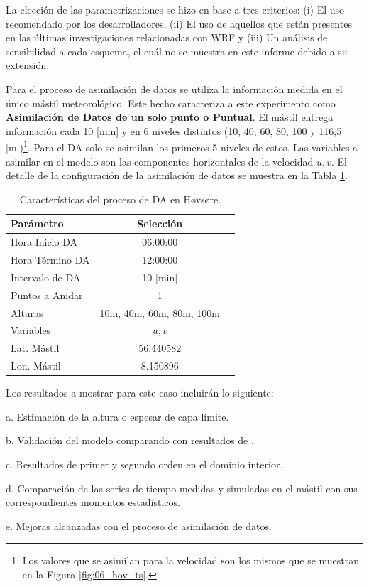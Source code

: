 
La elección de las parametrizaciones se hizo en base a tres criterios: (i) El uso recomendado por los desarrolladores, (ii) El uso de aquellos que están presentes en las últimas investigaciones relacionadas con WRF y (iii) Un análisis de sensibilidad a cada esquema, el cuál no se muestra en este informe debido a su extensión.

Para el proceso de asimilación de datos se utiliza la información medida en el único mástil meteorológico. Este hecho caracteriza a este experimento como \textbf{Asimilación de Datos de un solo punto o Puntual}. El mástil entrega información cada 10 [min] y en 6 niveles distintos (10, 40, 60, 80, 100 y 116,5 [m])\footnote{Los valores que se asimilan para la velocidad son los mismos que se muestran en la Figura \ref{fig:06_hov_ts}.}. Para el DA solo se asimilan los primeros 5 niveles de estos. Las variables a asimilar en el modelo son las componentes horizontales de la velocidad $u,v$. El detalle de la configuración de la asimilación de datos se muestra en la Tabla \ref{tab:05_config_da_hov}.

\begin{table}[h!]
	\caption{Características del proceso de DA en Høvsøre.}\label{tab:05_config_da_hov}
	\centering\footnotesize
	\begin{tabular}{lcc}
		\toprule
		Parámetro & Selección \\
		\midrule
		Hora Inicio	DA 	 & 06:00:00   \\
		Hora Término DA	 		 & 12:00:00  \\
		Intervalo de DA	&	10 [min] \\
		Puntos a Anidar	 	 & 1   \\
		Alturas 	& 10m, 40m, 60m, 80m, 100m \\
		Variables	& $u,v$   \\
		Lat. Mástil	& 56.440582   \\
		Lon. Mástil	& 8.150896   \\
		
		\bottomrule
	\end{tabular}
\end{table}
\newpage
Los resultados a mostrar para este caso incluirán lo siguiente:
\begin{enumerate*}
	\item [a.]Estimación de la altura o espesar de capa límite.
	\item [b.]Validación del modelo comparando con resultados de \cite{Pea2013}.
	\item [c.]Resultados de primer y segundo orden en el dominio interior.
	\item [d.]Comparación de las series de tiempo medidas y simuladas en el mástil con sus correspondientes momentos estadísticos.
	\item [e.]Mejoras alcanzadas con el proceso de asimilación de datos.
\end{enumerate*}

